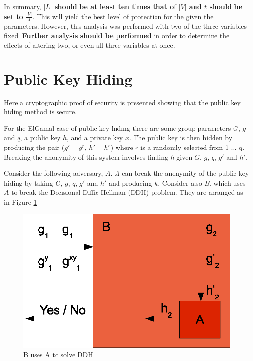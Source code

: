 \documentclass[ %
                    author={Luke Murray},
                supervisor={Dr. Simon Hollis},
                     title={Shadow Peer-to-Peer Networks},
                  subtitle={},
                    degree={MEng},
                      year={2013} ]{thesis}
\begin{document}
In summary, \textbf{$|L|$ should be at least ten times that of $|V|$ and $t$ should be set to $\frac{|V|}{4}$}. This will yield the best level of protection for the given the parameters. However, this analysis was performed with two of the three variables fixed. \textbf{Further analysis should be performed} in order to determine the effects of altering two, or even all three variables at once.

\section{Public Key Hiding}

Here a cryptographic proof of security is presented showing that the public key hiding method is secure.

For the ElGamal case of public key hiding there are some group parameters $G$, $g$ and $q$, a public key $h$, and a private key $x$. The public key is then hidden by producing the pair ($g\prime = g^{r}$, $h\prime = h^{r}$) where $r$ is a randomly selected from {1 ... q}. Breaking the anonymity of this system involves finding $h$ given $G$, $g$, $q$, $g\prime$ and $h\prime$.

Consider the following adversary, $A$. $A$ can break the anonymity of the public key hiding by taking $G$, $g$, $q$, $g\prime$ and $h\prime$ and producing $h$. Consider also $B$, which uses $A$ to break the Decisional Diffie Hellman (DDH) problem\cite{boneh1998decision}. They are arranged as in Figure \ref{crypto_diag}

\begin{figure}[h]
    \centering
    \begin{minipage}[b]{0.6\linewidth}
        \centering
        \includegraphics[width=\linewidth]{diagrams/crypto_proof.eps}
        \caption{B uses A to solve DDH}
        \label{crypto_diag}
    \end{minipage}
\end{figure}
\end{document}
